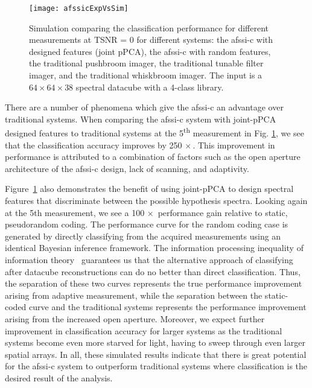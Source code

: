 \begin{figure}[htb]
  \centering
  \texttt{[image: afssicExpVsSim]}\\%
  \caption{Simulation comparing the classification performance for different measurements at TSNR = 0 for different systems: the \gls{afssi-c} with designed features (joint pPCA), the \gls{afssi-c} with random features, the traditional pushbroom imager, the traditional tunable filter imager, and the traditional whiskbroom imager. The input is a $64 \times 64 \times 38$ spectral datacube with a 4-class library.} \label{fig:afssicExpVsSim}
\end{figure}


There are a number of phenomena which give the \gls{afssi-c} an advantage over traditional systems. When comparing the \gls{afssi-c} system with joint-pPCA designed features to traditional systems at the 5\textsuperscript{th} measurement in Fig. \ref{fig:afssicExpVsSim}, we see that the classification accuracy improves by 250$\,\times$. This improvement in performance is attributed to a combination of factors such as the open aperture architecture of the \gls{afssi-c} design, lack of scanning, and adaptivity. 

Figure~\ref{fig:afssicExpVsSim} also demonstrates the benefit of using joint-pPCA to design spectral features that discriminate between the possible hypothesis spectra. Looking again at the 5th measurement, we see a 100$\,\times$ performance gain relative to static, pseudorandom coding. The performance curve for the random coding case is generated by directly classifying from the acquired measurements using an identical Bayesian inference framework. The information processing inequality of information theory~\cite{cover2012elements} guarantees us that the alternative approach of classifying after datacube reconstructions can do no better than direct classification. Thus, the separation of these two curves represents the true performance improvement arising from adaptive measurement, while the separation between the static-coded curve and the traditional systems represents the performance improvement arising from the increased open aperture.  Moreover, we expect further improvement in classification accuracy for larger systems as the traditional systems become even more starved for light, having to sweep through even larger spatial arrays. In all, these simulated results indicate that there is great potential for the \gls{afssi-c} system to outperform traditional systems where classification is the desired result of the analysis.


